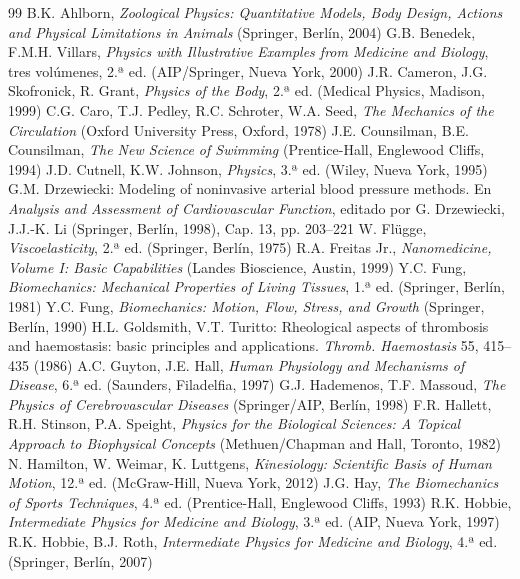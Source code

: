 \documentclass[12pt]{book}
\begin{document}
\begin{thebibliography}{99}
   B.K. Ahlborn, \textit{Zoological Physics: Quantitative Models, Body Design, Actions and Physical Limitations in Animals} (Springer, Berlín, 2004)
   G.B. Benedek, F.M.H. Villars, \textit{Physics with Illustrative Examples from Medicine and Biology}, tres volúmenes, 2.ª ed. (AIP/Springer, Nueva York, 2000)
   J.R. Cameron, J.G. Skofronick, R. Grant, \textit{Physics of the Body}, 2.ª ed. (Medical Physics, Madison, 1999)
   C.G. Caro, T.J. Pedley, R.C. Schroter, W.A. Seed, \textit{The Mechanics of the Circulation} (Oxford University Press, Oxford, 1978)
   J.E. Counsilman, B.E. Counsilman, \textit{The New Science of Swimming} (Prentice-Hall, Englewood Cliffs, 1994)
   J.D. Cutnell, K.W. Johnson, \textit{Physics}, 3.ª ed. (Wiley, Nueva York, 1995)
   G.M. Drzewiecki: Modeling of noninvasive arterial blood pressure methods. En \textit{Analysis and Assessment of Cardiovascular Function}, editado por G. Drzewiecki, J.J.-K. Li (Springer, Berlín, 1998), Cap. 13, pp. 203--221
   W. Flügge, \textit{Viscoelasticity}, 2.ª ed. (Springer, Berlín, 1975)
   R.A. Freitas Jr., \textit{Nanomedicine, Volume I: Basic Capabilities} (Landes Bioscience, Austin, 1999)
   Y.C. Fung, \textit{Biomechanics: Mechanical Properties of Living Tissues}, 1.ª ed. (Springer, Berlín, 1981)
   Y.C. Fung, \textit{Biomechanics: Motion, Flow, Stress, and Growth} (Springer, Berlín, 1990)
   H.L. Goldsmith, V.T. Turitto: Rheological aspects of thrombosis and haemostasis: basic principles and applications. \textit{Thromb. Haemostasis} 55, 415--435 (1986)
   A.C. Guyton, J.E. Hall, \textit{Human Physiology and Mechanisms of Disease}, 6.ª ed. (Saunders, Filadelfia, 1997)
   G.J. Hademenos, T.F. Massoud, \textit{The Physics of Cerebrovascular Diseases} (Springer/AIP, Berlín, 1998)
   F.R. Hallett, R.H. Stinson, P.A. Speight, \textit{Physics for the Biological Sciences: A Topical Approach to Biophysical Concepts} (Methuen/Chapman and Hall, Toronto, 1982)
   N. Hamilton, W. Weimar, K. Luttgens, \textit{Kinesiology: Scientific Basis of Human Motion}, 12.ª ed. (McGraw-Hill, Nueva York, 2012)
   J.G. Hay, \textit{The Biomechanics of Sports Techniques}, 4.ª ed. (Prentice-Hall, Englewood Cliffs, 1993)
   R.K. Hobbie, \textit{Intermediate Physics for Medicine and Biology}, 3.ª ed. (AIP, Nueva York, 1997)
   R.K. Hobbie, B.J. Roth, \textit{Intermediate Physics for Medicine and Biology}, 4.ª ed. (Springer, Berlín, 2007)

\end{thebibliography}
\end{document}
